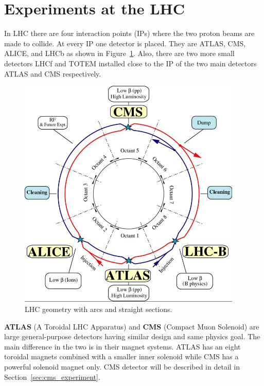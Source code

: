 
\section{Experiments at the LHC} %
\label{sec:experiments_at_the_lhc}

In LHC there are four interaction points (IPs) where the two proton beams are made to collide. At every IP one detector is placed. They are ATLAS, CMS, ALICE, and LHCb as shown in Figure~\ref{fig:LHCgeometry}. Also, there are two more small detectors LHCf and TOTEM installed close to the IP of the two main detectors ATLAS and CMS respectively.
\begin{figure}[!htbp]
	\centering
	\includegraphics[width=0.95\textwidth]{figures/LHC/lhc-schematic.jpg}
	\caption{LHC geometry with arcs and straight sections.}
	\label{fig:LHCgeometry}
\end{figure}

{\bf ATLAS} (A Toroidal LHC Apparatus) and {\bf CMS} (Compact Muon Solenoid) are large general-purpose detectors having similar design and same physics goal. The main difference in the two is in their magnet systems. ATLAS has an eight toroidal magnets combined with a smaller inner solenoid while CMS has a powerful solenoid magnet only. CMS detector will be described in detail in Section~\ref{sec:cms_experiment}.

